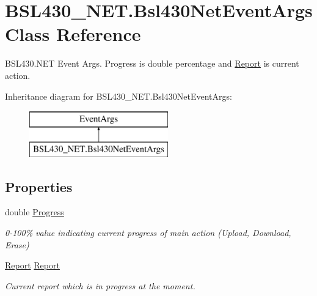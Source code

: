 \hypertarget{class_b_s_l430___n_e_t_1_1_bsl430_net_event_args}{}\section{B\+S\+L430\+\_\+\+N\+E\+T.\+Bsl430\+Net\+Event\+Args Class Reference}
\label{class_b_s_l430___n_e_t_1_1_bsl430_net_event_args}


B\+S\+L430.\+N\+ET Event Args. Progress is double percentage and \mbox{\hyperlink{class_b_s_l430___n_e_t_1_1_report}{Report}} is current action.  


Inheritance diagram for B\+S\+L430\+\_\+\+N\+E\+T.\+Bsl430\+Net\+Event\+Args\+:\begin{figure}[H]
\begin{center}
\leavevmode
\includegraphics[height=2.000000cm]{class_b_s_l430___n_e_t_1_1_bsl430_net_event_args}
\end{center}
\end{figure}
\subsection*{Properties}
\begin{DoxyCompactItemize}
\item 
double \mbox{\hyperlink{class_b_s_l430___n_e_t_1_1_bsl430_net_event_args_ae22881015ffeb55141c097bc95add7fe}{Progress}}
\begin{DoxyCompactList}\small\item\em 0-\/100\% value indicating current progress of main action (Upload, Download, Erase) \end{DoxyCompactList}\item 
\mbox{\hyperlink{class_b_s_l430___n_e_t_1_1_report}{Report}} \mbox{\hyperlink{class_b_s_l430___n_e_t_1_1_bsl430_net_event_args_a82b43c90f3c74a8ebfe93a98559fcf92}{Report}}
\begin{DoxyCompactList}\small\item\em Current report which is in progress at the moment. \end{DoxyCompactList}\end{DoxyCompactItemize}



